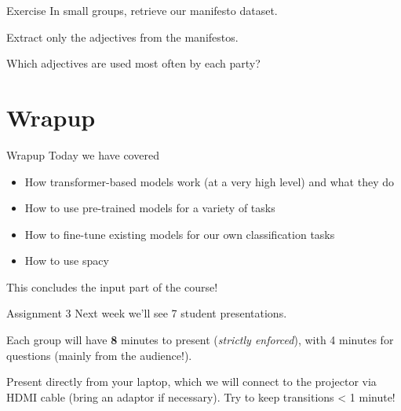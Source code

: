 \documentclass[
  10pt,
  ignorenonframetext,
  aspectratio=169]{beamer}
\newif\ifbibliography
\providecommand{\tightlist}{%
  \setlength{\itemsep}{0pt}\setlength{\parskip}{0pt}}
\begin{document}
\begin{frame}{Exercise}
\protect\hypertarget{exercise-1}{}
In small groups, retrieve our manifesto dataset.

Extract only the adjectives from the manifestos.

Which adjectives are used most often by each party?
\end{frame}

\hypertarget{wrapup}{%
\section{Wrapup}\label{wrapup}}

\begin{frame}{Wrapup}
\protect\hypertarget{wrapup-1}{}
Today we have covered

\begin{itemize}
\tightlist
\item
  How transformer-based models work (at a very high level) and what they
  do
\item
  How to use pre-trained models for a variety of tasks
\item
  How to fine-tune existing models for our own classification tasks
\item
  How to use spacy
\end{itemize}

This concludes the input part of the course!
\end{frame}

\begin{frame}{Assignment 3}
\protect\hypertarget{assignment-3}{}
Next week we'll see 7 student presentations.

Each group will have \textbf{8} minutes to present (\emph{strictly
enforced}), with 4 minutes for questions (mainly from the audience!).

Present directly from your laptop, which we will connect to the
projector via HDMI cable (bring an adaptor if necessary). Try to keep
transitions \textless{} 1 minute!
\end{frame}

\begin{frame}[allowframebreaks]{}
  \bibliographytrue
  
\end{frame}
\end{document}
